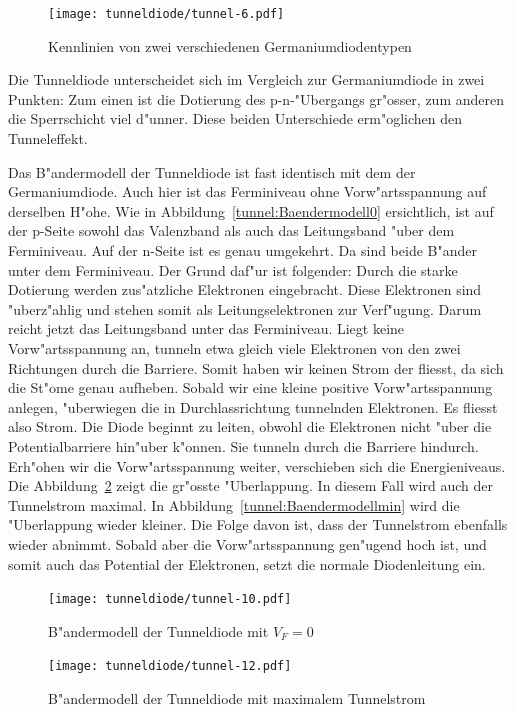 \begin{refsection}
\begin{figure}	%
\centering
\texttt{[image: tunneldiode/tunnel-6.pdf]}
\caption{Kennlinien von zwei verschiedenen Germaniumdiodentypen
\label{tunnel:Germaniumdioden}}
\end{figure}

Die Tunneldiode unterscheidet sich im Vergleich zur Germaniumdiode in zwei Punkten:
Zum einen ist die Dotierung des p-n-"Ubergangs gr"osser, zum anderen die Sperrschicht viel d"unner. 
Diese beiden Unterschiede erm"oglichen den Tunneleffekt.

Das B"andermodell der Tunneldiode ist fast identisch mit dem der Germaniumdiode. 
Auch hier ist das Ferminiveau ohne Vorw"artsspannung auf derselben H"ohe. 
Wie in Abbildung~\ref{tunnel:Baendermodell0} ersichtlich, ist auf der p-Seite sowohl das Valenzband als auch das Leitungsband "uber dem Ferminiveau. 
Auf der n-Seite ist es genau umgekehrt. 
Da sind beide B"ander unter dem Ferminiveau.
Der Grund daf"ur ist folgender:
Durch die starke Dotierung werden zus"atzliche Elektronen eingebracht.
Diese Elektronen sind "uberz"ahlig und stehen somit als Leitungselektronen zur Verf"ugung.
Darum reicht jetzt das Leitungsband unter das Ferminiveau.
Liegt keine Vorw"artsspannung an, tunneln etwa gleich viele Elektronen von den zwei Richtungen durch die Barriere.
Somit haben wir keinen Strom der fliesst, da sich die St"ome genau aufheben.
Sobald wir eine kleine positive Vorw"artsspannung anlegen, "uberwiegen die in Durchlassrichtung tunnelnden Elektronen.
Es fliesst also Strom.
Die Diode beginnt zu leiten, obwohl die Elektronen nicht "uber die Potentialbarriere hin"uber k"onnen. 
Sie tunneln durch die Barriere hindurch.
Erh"ohen wir die Vorw"artsspannung weiter, verschieben sich die Energieniveaus.
Die Abbildung~\ref{tunnel:Baendermodellmax} zeigt die gr"osste "Uberlappung. 
In diesem Fall wird auch der Tunnelstrom maximal. 
In Abbildung~\ref{tunnel:Baendermodellmin} wird die "Uberlappung wieder kleiner. 
Die Folge davon ist, dass der Tunnelstrom ebenfalls wieder abnimmt.
Sobald aber die Vorw"artsspannung gen"ugend hoch ist, und somit auch das Potential der Elektronen, setzt die normale Diodenleitung ein.

\begin{figure}	%
\centering
\texttt{[image: tunneldiode/tunnel-10.pdf]}
\caption{B"andermodell der Tunneldiode mit $V_F = 0$
\label{tunnel:Baendermodell0}}

\centering
\texttt{[image: tunneldiode/tunnel-12.pdf]}
\caption{B"andermodell der Tunneldiode mit maximalem Tunnelstrom
\label{tunnel:Baendermodellmax}}


\end{figure}
\end{refsection}
